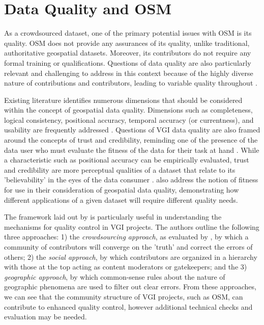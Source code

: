 \section{Data Quality and OSM}

As a crowdsourced dataset, one of the primary potential issues with OSM is its quality. OSM does not provide any assurances of its quality, unlike traditional, authoritative geospatial datasets. Moreover, its contributors do not require any formal training or qualifications. Questions of data quality are also particularly relevant and challenging to address in this context because of the highly diverse nature of contributions and contributors, leading to variable quality throughout  \parencite{grochenig_digging_2014, haklay_how_2010, neis_analyzing_2012, girres_quality_2010}. 

Existing literature identifies numerous dimensions that should be considered within the concept of geospatial data quality. Dimensions such as completeness, logical consistency, positional accuracy, temporal accuracy (or currentness), and usability are frequently addressed \parencite{fox_notion_1994, antoniou_measures_2015, van_oort_spatial_2006}. Questions of VGI data quality are also framed around the concepts of trust and credibility, reminding one of the presence of the data user who must evaluate the fitness of the data for their task at hand \parencite{flanagin_credibility_2008, severinsen_vgtrust_2019}. While a characteristic such as positional accuracy can be empirically evaluated, trust and credibility are more perceptual qualities of a dataset that relate to its 'believability' in the eyes of the data consumer \parencite{flanagin_credibility_2008}. \textcite{barron_comprehensive_2014} also address the notion of fitness for use in their consideration of geospatial data quality, demonstrating how different applications of a given dataset will require different quality needs. 

The framework laid out by \textcite{goodchild_assuring_2012} is particularly useful in understanding the mechanisms for quality control in VGI projects. The authors outline the following three approaches: 1) the \textit{crowdsourcing approach}, as evaluated by \textcite{haklay_how_2010-1}, by which a community of contributors will converge on the 'truth' and correct the errors of others; 2) the \textit{social approach}, by which contributors are organized in a hierarchy with those at the top acting as content moderators or gatekeepers; and the 3) \textit{geographic approach}, by which common-sense rules about the nature of geographic phenomena are used to filter out clear errors. From these approaches, we can see that the community structure of VGI projects, such as OSM, can contribute to enhanced quality control, however additional technical checks and evaluation may be needed.

